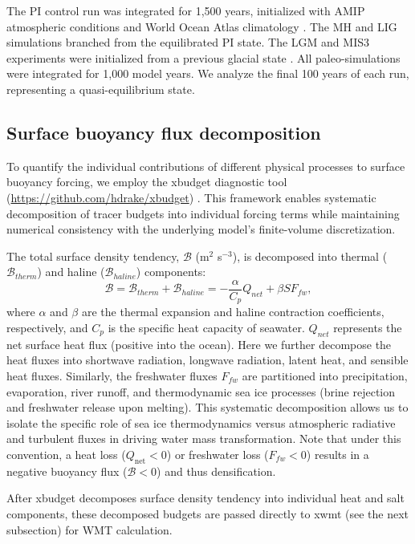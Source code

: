 \documentclass[pdflatex,sn-nature]{sn-jnl}
\begin{document}
The PI control run was integrated for 1,500 years, initialized with AMIP atmospheric conditions \cite{roeckner2004atmospheric} and World Ocean Atlas climatology \cite{levitus2010world}. The MH and LIG simulations branched from the equilibrated PI state. The LGM and MIS3 experiments were initialized from a previous glacial state \cite{werner2016glacial}. All paleo-simulations were integrated for 1,000 model years. We analyze the final 100 years of each run, representing a quasi-equilibrium state.


\subsection{Surface buoyancy flux decomposition}

To quantify the individual contributions of different physical processes to surface buoyancy forcing, we employ the xbudget diagnostic tool (\url{https://github.com/hdrake/xbudget}) \cite{drake2025water}. This framework enables systematic decomposition of tracer budgets into individual forcing terms while maintaining numerical consistency with the underlying model's finite-volume discretization.

The total surface density tendency, $\mathcal{B}$ (m$^2$ s$^{-3}$), is decomposed into thermal ($\mathcal{B}_{therm}$) and haline ($\mathcal{B}_{haline}$) components:
\begin{equation}
\mathcal{B} = \mathcal{B}_{therm} + \mathcal{B}_{haline} = -\frac{\alpha}{C_p} Q_{net} + \beta S F_{fw},
\end{equation}
where $\alpha$ and $\beta$ are the thermal expansion and haline contraction coefficients, respectively, and $C_p$ is the specific heat capacity of seawater. $Q_{net}$ represents the net surface heat flux (positive into the ocean). Here we further decompose the heat fluxes into shortwave radiation, longwave radiation, latent heat, and sensible heat fluxes. Similarly, the freshwater fluxes $F_{fw}$ are partitioned into precipitation, evaporation, river runoff, and thermodynamic sea ice processes (brine rejection and freshwater release upon melting). This systematic decomposition allows us to isolate the specific role of sea ice thermodynamics versus atmospheric radiative and turbulent fluxes in driving water mass transformation. Note that under this convention, a heat loss ($Q_{\text{net}} < 0$) or freshwater loss ($F_{fw} < 0$) results in a negative buoyancy flux ($\mathcal{B} < 0$) and thus densification.

After xbudget decomposes surface density tendency into individual heat and salt components, these decomposed budgets are passed directly to xwmt (see the next subsection) for WMT calculation.
\end{document}
